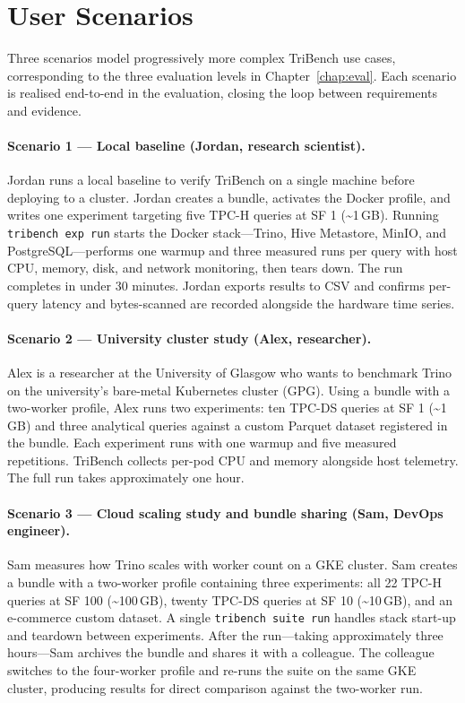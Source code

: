 \documentclass{l4proj}
\begin{document}
\section{User Scenarios}
\label{sec:user_scenarios}

Three scenarios model progressively more complex TriBench use cases, corresponding to the three evaluation levels in Chapter~\ref{chap:eval}. Each scenario is realised end-to-end in the evaluation, closing the loop between requirements and evidence.

\paragraph{Scenario 1 --- Local baseline (Jordan, research scientist).}
Jordan runs a local baseline to verify TriBench on a single machine before deploying to a cluster. Jordan creates a bundle, activates the Docker profile, and writes one experiment targeting five TPC-H queries at SF 1 (\textasciitilde1\,GB). Running \texttt{tribench exp run} starts the Docker stack---Trino, Hive Metastore, MinIO, and PostgreSQL---performs one warmup and three measured runs per query with host CPU, memory, disk, and network monitoring, then tears down. The run completes in under 30 minutes. Jordan exports results to CSV and confirms per-query latency and bytes-scanned are recorded alongside the hardware time series.

\paragraph{Scenario 2 --- University cluster study (Alex, researcher).}
Alex is a researcher at the University of Glasgow who wants to benchmark Trino on the university's bare-metal Kubernetes cluster (GPG). Using a bundle with a two-worker profile, Alex runs two experiments: ten TPC-DS queries at SF 1 (\textasciitilde1\,GB) and three analytical queries against a custom Parquet dataset registered in the bundle. Each experiment runs with one warmup and five measured repetitions. TriBench collects per-pod CPU and memory alongside host telemetry. The full run takes approximately one hour.

\paragraph{Scenario 3 --- Cloud scaling study and bundle sharing (Sam, DevOps engineer).}
Sam measures how Trino scales with worker count on a GKE cluster. Sam creates a bundle with a two-worker profile containing three experiments: all 22 TPC-H queries at SF 100 (\textasciitilde100\,GB), twenty TPC-DS queries at SF 10 (\textasciitilde10\,GB), and an e-commerce custom dataset. A single \texttt{tribench suite run} handles stack start-up and teardown between experiments. After the run---taking approximately three hours---Sam archives the bundle and shares it with a colleague. The colleague switches to the four-worker profile and re-runs the suite on the same GKE cluster, producing results for direct comparison against the two-worker run.
\end{document}
